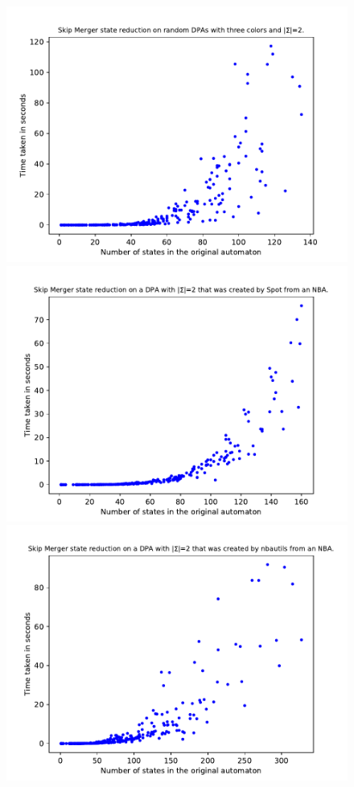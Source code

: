 \begin{figure}
	\centering
	\begin{minipage}{0.49\textwidth}
		\includegraphics[page=6,height=.3\textheight]{../data/analysis/skipper/gendet_ap1.pdf} 
		\includegraphics[page=6,height=.3\textheight]{../data/analysis/skipper/detspot_ap1.pdf} 
		\includegraphics[page=6,height=.3\textheight]{../data/analysis/skipper/detnbaut_ap1.pdf} 

\end{minipage}
\end{figure}
